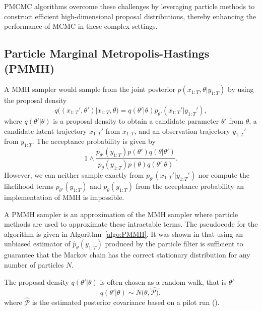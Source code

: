 \gls*{PMCMC} algorithms overcome these challenges by leveraging particle methods to construct efficient high-dimensional proposal distributions, thereby enhancing the performance of MCMC in these complex settings.

\subsection{Particle Marginal Metropolis-Hastings (PMMH)}
A \gls*{MMH} sampler would sample from the joint posterior $p(x_{1:T}, \theta \vert y_{1:T})$ by using the proposal density
\begin{equation}
	q\bigl((x_{1:T}', \theta') \vert x_{1:T}, \theta\bigr)=q(\theta'\vert \theta)p_{\theta'}(x_{1:T}' \vert y_{1:T}'),
\end{equation}
where $q(\theta' \vert \theta)$ is a proposal density to obtain a candidate parameter $\theta'$ from $\theta$, a candidate latent trajectory $x_{1:T}'$ from $x_{1:T}$, and an observation trajectory $y_{1:T}'$ from $y_{1:T}$. The acceptance probability is given by
\begin{equation}
	1 \wedge \frac{p_{\theta'}(y_{1:T})p(\theta')q(\theta \vert \theta')}{p_\theta(y_{1:T})p(\theta)q(\theta' \vert \theta)}.
\end{equation}
However, we can neither sample exactly from $p_{\theta'}(x_{1:T}' \vert y_{1:T}')$ nor compute the likelihood terms $p_{\theta'}(y_{1:T})$ and $p_{\theta}(y_{1:T})$ from the acceptance probability an implementation of \gls*{MMH} is impossible. 

A \gls*{PMMH} sampler is an approximation of the \gls*{MMH} sampler where particle methods are used to approximate these intractable terms. The pseudocode for the algorithm is given in Algorithm~\ref{algo:PMMH}. It was shown in \cite{Andrieu} that using an unbiased estimator of $\widehat{p}_\theta(y_{1:T})$ produced by the particle filter is sufficient to guarantee that the Markov chain has the correct stationary distribution for any number of particles $N$. 

The proposal density $q(\theta'\vert \theta)$ is often chosen as a random walk, that is $\theta'$ 
\[q(\theta' \vert \theta) \sim N(\theta, \hat{\mathcal{P})},\]
where $\hat{\mathcal{P}}$ is the estimated posterior covariance based on a pilot run (\cite{gettingstarted}).

